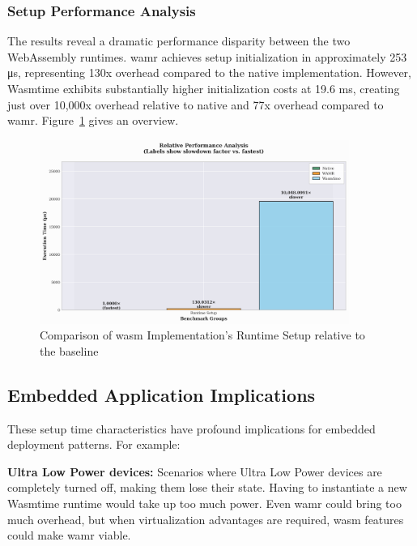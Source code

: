\subsubsection{Setup Performance Analysis}
The results reveal a dramatic performance disparity between the two WebAssembly runtimes. \acrshort{wamr} achieves setup initialization in approximately 253 μs, representing 130x overhead compared to the native implementation. However, Wasmtime exhibits substantially higher initialization costs at 19.6 ms, creating just over 10,000x overhead relative to native and 77x overhead compared to \acrshort{wamr}. Figure~\ref{fig:wasm-setup-relative} gives an overview.

\begin{figure}[h]
    \centering
    \includegraphics[width=0.9\textwidth]{images/wasm-setup-relative}
    \caption{Comparison of \acrshort{wasm} Implementation's Runtime Setup relative to the baseline}
    \label{fig:wasm-setup-relative}
\end{figure}

\subsection{Embedded Application Implications}
\label{subsec:setup-implications}

These setup time characteristics have profound implications for embedded deployment patterns. For example:

\textbf{Ultra Low Power devices:} Scenarios where Ultra Low Power devices are completely turned off, making them lose their state. Having to instantiate a new Wasmtime runtime would take up too much power. Even \acrshort{wamr} could bring too much overhead, but when virtualization advantages are required, \acrshort{wasm} features could make \acrshort{wamr} viable.

